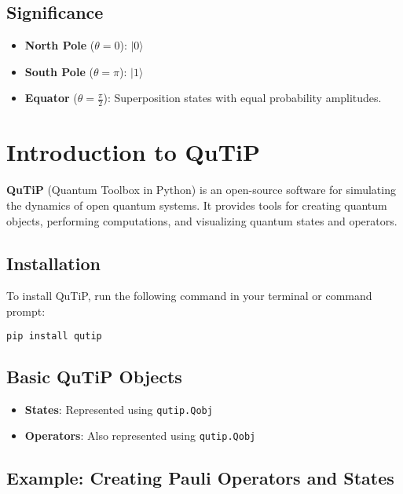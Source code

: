 \documentclass[12pt]{article}
\begin{document}
\subsection{Significance}

\begin{itemize}
    \item \textbf{North Pole} (\( \theta=0 \)): \( |0\rangle \)
    \item \textbf{South Pole} (\( \theta=\pi \)): \( |1\rangle \)
    \item \textbf{Equator} (\( \theta=\frac{\pi}{2} \)): Superposition states with equal probability amplitudes.
\end{itemize}

\section{Introduction to QuTiP}

\textbf{QuTiP} (Quantum Toolbox in Python) is an open-source software for simulating the dynamics of open quantum systems. It provides tools for creating quantum objects, performing computations, and visualizing quantum states and operators.

\subsection{Installation}

To install QuTiP, run the following command in your terminal or command prompt:
\begin{lstlisting}[language=bash]
pip install qutip
\end{lstlisting}

\subsection{Basic QuTiP Objects}

\begin{itemize}
    \item \textbf{States}: Represented using \texttt{qutip.Qobj}
    \item \textbf{Operators}: Also represented using \texttt{qutip.Qobj}
\end{itemize}

\subsection{Example: Creating Pauli Operators and States}
\end{document}
